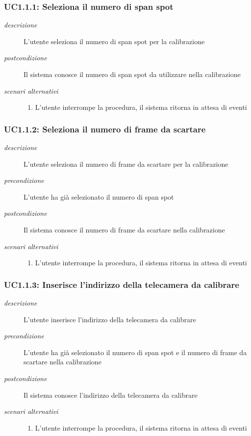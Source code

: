 \subsubsection{UC1.1.1: Seleziona il numero di span spot} \label{sec:UC1.1.1}
\begin{description}
\item[\em{descrizione }]L'utente seleziona il numero di span spot per la calibrazione
\item[\em{postcondizione }] Il sistema conosce il numero di span spot da utilizzare nella calibrazione
\item[\em{scenari alternativi }] \mbox{} 
\begin{enumerate} 
\item L'utente interrompe la procedura, il sistema ritorna in attesa di eventi
\end{enumerate}
\end{description}

\subsubsection{UC1.1.2: Seleziona il numero di frame da scartare} \label{sec:UC1.1.2}
\begin{description}
\item[\em{descrizione }]L'utente seleziona il numero di frame da scartare per la calibrazione
\item[\em{precondizione }] L'utente ha già selezionato il numero di span spot
\item[\em{postcondizione }] Il sistema conosce il numero di frame da scartare nella calibrazione
\item[\em{scenari alternativi }] \mbox{} 
\begin{enumerate} 
\item L'utente interrompe la procedura, il sistema ritorna in attesa di eventi
\end{enumerate}
\end{description}

\subsubsection{UC1.1.3: Inserisce l'indirizzo della telecamera da calibrare} \label{sec:UC1.1.3}
\begin{description}
\item[\em{descrizione }]L'utente inserisce l'indirizzo della telecamera da calibrare
\item[\em{precondizione }] L'utente ha già selezionato il numero di span spot e il numero di frame da scartare nella calibrazione
\item[\em{postcondizione }] Il sistema conosce l'indirizzo della telecamera da calibrare
\item[\em{scenari alternativi }] \mbox{} 
\begin{enumerate} 
\item L'utente interrompe la procedura, il sistema ritorna in attesa di eventi
\end{enumerate}
\end{description}


